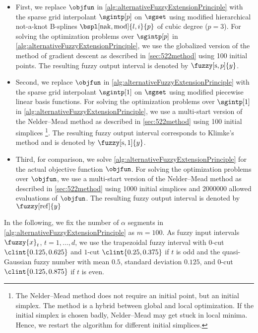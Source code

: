 \begin{itemize}
  \item
  First,
  we replace $\objfun$ in \cref{alg:alternativeFuzzyExtensionPrinciple}
  with the sparse grid interpolant $\sgintp[p]$
  on $\sgset$ using modified hierarchical not-a-knot B-splines
  $\bspl[\nak,\modified]{l,i}{p}$ of cubic degree ($p = 3$).
  For solving the optimization problems over $\sgintp[p]$ in
  \cref{alg:alternativeFuzzyExtensionPrinciple},
  we use the globalized version of the method of gradient descent
  as described in \cref{sec:522method} using 100 initial points.
  The resulting fuzzy output interval is denoted by $\fuzzy[\sparse,p]{y}$.
  
  \item
  Second,
  we replace $\objfun$ in \cref{alg:alternativeFuzzyExtensionPrinciple}
  with the sparse grid interpolant $\sgintp[1]$
  on $\sgset$ using modified piecewise linear basis functions.
  For solving the optimization problems over $\sgintp[1]$ in
  \cref{alg:alternativeFuzzyExtensionPrinciple},
  we use a multi-start version of the Nelder--Mead method
  as described in \cref{sec:522method}
  using 100 initial simplices%
  \footnote{%
    The Nelder--Mead method does not require an initial point,
    but an initial simplex.
    The method is a hybrid between global and local optimization.
    If the initial simplex is chosen badly, Nelder--Mead may get stuck
    in local minima.
    Hence, we restart the algorithm for different initial simplices.%
  }.
  The resulting fuzzy output interval corresponds to Klimke's method and
  is denoted by $\fuzzy[\sparse,1]{y}$.
  
  \item
  Third,
  for comparison, we solve
  \cref{alg:alternativeFuzzyExtensionPrinciple} for the
  actual objective function $\objfun$.
  For solving the optimization problems over $\objfun$,
  we use a multi-start version of the Nelder--Mead method
  as described in \cref{sec:522method}
  using 1000 initial simplices
  and \num{2000000} allowed evaluations of $\objfun$.
  The resulting fuzzy output interval is denoted by $\fuzzy[\reference]{y}$
\end{itemize}

\noindent
In the following, we fix the number of $\alpha$ segments
in \cref{alg:alternativeFuzzyExtensionPrinciple} as $m = 100$.
As fuzzy input intervals $\fuzzy{x}_t$, $t = 1, \dotsc, d$, we use
the trapezoidal fuzzy interval with $0$-cut $\clint{0.125, 0.625}$
and $1$-cut $\clint{0.25, 0.375}$ if $t$ is odd and
the quasi-Gaussian fuzzy number with mean $0.5$, standard deviation $0.125$,
and $0$-cut $\clint{0.125, 0.875}$ if $t$ is even.

